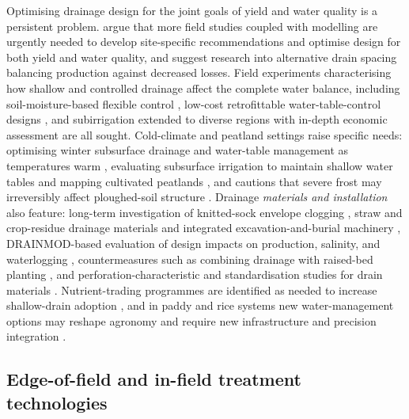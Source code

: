 \documentclass[11pt]{article}
\begin{document}
Optimising drainage design for the joint goals of yield and water quality is a persistent problem. \textcite{Kladivko2021} argue that more field studies coupled with modelling are urgently needed to develop site-specific recommendations and optimise design for both yield and water quality, and \textcite{Zhao2016} suggest research into alternative drain spacing balancing production against decreased losses. Field experiments characterising how shallow and controlled drainage affect the complete water balance, including soil-moisture-based flexible control \parencite{Singh2006b,Singh2007b}, low-cost retrofittable water-table-control designs \parencite{Dinnes2002}, and subirrigation extended to diverse regions with in-depth economic assessment \parencite{Gunn2019,Baker2004} are all sought. Cold-climate and peatland settings raise specific needs: optimising winter subsurface drainage and water-table management as temperatures warm \parencite{Li2025}, evaluating subsurface irrigation to maintain shallow water tables and mapping cultivated peatlands \parencite{Läpikivi2025}, and cautions that severe frost may irreversibly affect ploughed-soil structure \parencite{STEINHARDT1974}. Drainage \emph{materials and installation} also feature: long-term investigation of knitted-sock envelope clogging \parencite{Ghane2022}, straw and crop-residue drainage materials and integrated excavation-and-burial machinery \parencite{Qi2025b,Lu2018}, DRAINMOD-based evaluation of design impacts on production, salinity, and waterlogging \parencite{Ellafi2021}, countermeasures such as combining drainage with raised-bed planting \parencite{Takeshima2023}, and perforation-characteristic and standardisation studies for drain materials \parencite{Zhang2025b,ASGHAR1995}. Nutrient-trading programmes are identified as needed to increase shallow-drain adoption \parencite{Ghane2021b}, and in paddy and rice systems new water-management options may reshape agronomy and require new infrastructure and precision integration \parencite{DarziNaftchali2014,Jung2024,Hashemi2020}.

\subsection{Edge-of-field and in-field treatment technologies}
\end{document}
